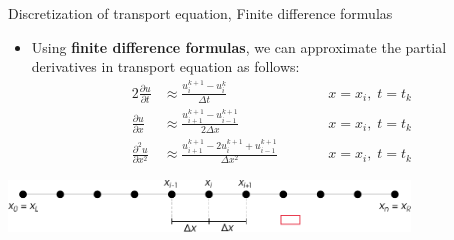 \begin{frame}{Discretization of transport equation, Finite difference formulas}

\begin{itemize}
\item Using \alert{\bf finite difference formulas}, we can approximate the partial derivatives in transport equation as follows:
%
\begin{alignat*}{2}
\frac{\partial u}{\partial t} & \approx\frac{u_{i}^{k+1}-u_{i}^{k}}{\Delta t} & \qquad & x=x_{i},\;t=t_{k}\\
\frac{\partial u}{\partial x} & \approx\frac{u_{i+1}^{k+1}-u_{i-1}^{k+1}}{2\Delta x} & \qquad & x=x_{i},\;t=t_{k}\\
\frac{\partial^{2}u}{\partial x^2} & \approx\frac{u_{i+1}^{k+1}-2u_{i}^{k+1}+u_{i-1}^{k+1}}{\Delta x^{2}} & \qquad & x=x_{i},\;t=t_{k}
\end{alignat*}
\end{itemize}

\vskip 20pt
\begin{center}
	\includegraphics[width=0.8\textwidth]{figures/reactive-transport/finite-difference-domain-discretization}
\end{center}

\end{frame}
%
%
